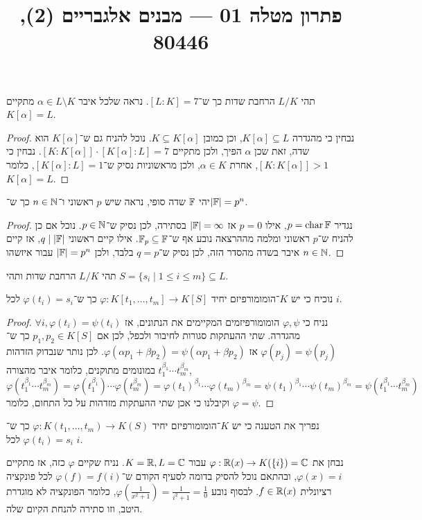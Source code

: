 
\title{פתרון מטלה 01 --- מבנים אלגבריים (2), 80446}


\maketitle
\maketitleprint{}

\question{}
תהי $L / K$ הרחבת שדות כך ש־$[L : K] = 7$.
נראה שלכל איבר $\alpha \in L \setminus K$ מתקיים $K[\alpha] = L$.
\begin{proof}
	נבחין כי מהגדרה $K[\alpha] \subseteq L$, וכן כמובן $K \subseteq K[\alpha]$.
	נוכל להניח גם ש־$K[\alpha]$ הוא שדה, זאת שכן $\alpha$ הפיך, ולכן מתקיים $[K : K[\alpha]] \cdot [K[\alpha] : L] = 7$.
	נבחין כי $[K : K[\alpha]] > 1$, אחרת $\alpha \in K$, ולכן מראשוניות נסיק ש־$[K[\alpha] : L] = 1$, כלומר $K[\alpha] = L$.
\end{proof}

\question{}
יהי $\mathbb{F}$ שדה סופי,
נראה שיש $p$ ראשוני ו־$n \in \mathbb{N}$ כך ש־$|\mathbb{F}| = p^n$.
\begin{proof}
	נגדיר $p = \operatorname{char} \mathbb{F}$, אילו $p = 0$ אז $|\mathbb{F}| = \infty$ בסתירה, לכן נסיק ש־$p \in \mathbb{N}$.
	נוכל אם כן להניח ש־$p$ ראשוני ומלמה מההרצאה נובע אף ש־$\mathbb{F}_p \subseteq \mathbb{F}$.
	אילו קיים ראשוני $q \mid |\mathbb{F}|$, אז קיים איבר בשדה מהסדר הזה, לכן נסיק ש־$q = p$ בלבד, ולכן $|\mathbb{F}| = p^n$ עבור איזשהו $n \in \mathbb{N}$.
\end{proof}

\question{}
תהי $L / K$ הרחבת שדות ותהי $S = \{ s_i \mid 1 \le i \le m \} \subseteq L$.

\subquestion{}
נוכיח כי יש $K$־הומומורפיזם יחיד $\varphi : K[t_1, \dots, t_m] \to K[S]$ כך ש־$\varphi(t_i) = s_i$ לכל $i$.
\begin{proof}
	נניח כי $\varphi, \psi$ הומומורפיזמים המקיימים את הנתונים, אז $\forall i, \varphi(t_i) = \psi(t_i)$ מהגדרה.
	שתי ההעתקות סגורות לחיבור ולכפל, לכן אם $p_1, p_2 \in K[S]$ כך ש־$\varphi(p_j) = \psi(p_j)$ אז $\varphi(\alpha p_1 + \beta p_2) = \psi(\alpha p_1 + \beta p_2)$.
	לכן נותר שנבדוק הזדהות במונומים מתוקנים, כלומר איבר מהצורה $t_1^{\beta_1} \cdots t_m^{\beta_m}$,
	\[
		\varphi(t_1^{\beta_1} \cdots t_m^{\beta_m})
		= \varphi(t_1^{\beta_1}) \cdots \varphi(t_m^{\beta_m})
		= {\varphi(t_1)}^{\beta_1} \cdots {\varphi(t_m)}^{\beta_m}
		= {\psi(t_1)}^{\beta_1} \cdots {\psi(t_m)}^{\beta_m}
		= \psi(t_1^{\beta_1} \cdots t_m^{\beta_m})
	\]
	וקיבלנו כי אכן שתי ההעתקות מזדהות על כל התחום, כלומר $\varphi = \psi$.
\end{proof}

\subquestion{}
נפריך את הטענה כי יש $K$־הומומורפיזם יחיד $\varphi : K(t_1, \dots, t_m) \to K(S)$ כך ש־$\varphi(t_i) = s_i$ לכל $i$.
\begin{solution}
	נבחן את $\varphi : \mathbb{R}(x) \to K(\{ i \}) = \mathbb{C}$ עבור $K = \mathbb{R}, L = \mathbb{C}$.
	נניח שקיים $\varphi$ כזה, אז מתקיים $\varphi(x) = i$, ובהתאם נוכל להסיק בדומה לסעיף הקודם ש־$\varphi(f) = f(i)$ לכל פונקציה רציונלית $f \in \mathbb{R}(x)$.
	לבסוף נובע $\varphi(\frac{1}{x^2 + 1}) = \frac{1}{i^2 + 1} = \frac{1}{0}$, כלומר הפונקציה לא מוגדרת היטב, וזו סתירה להנחת הקיום שלה.
\end{solution}

